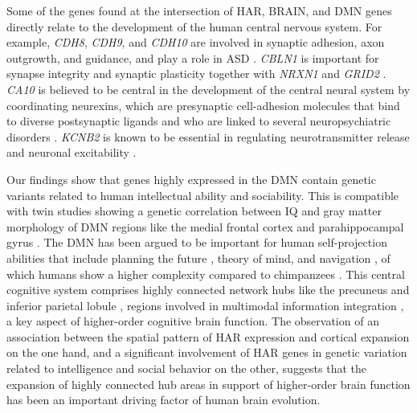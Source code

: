 \begin{refsection}
Some of the genes found at the intersection of HAR, BRAIN, and DMN genes directly relate to the development of the human central nervous system. For example, \textit{CDH8}, \textit{CDH9}, and \textit{CDH10} are involved in synaptic adhesion, axon outgrowth, and guidance, and play a role in ASD \citep{redies2012cadherins}. \textit{CBLN1} is important for synapse integrity and synaptic plasticity together with \textit{NRXN1} and \textit{GRID2} \citep{hirai2005cbln1}. \textit{CA10} is believed to be central in the development of the central neural system by coordinating neurexins, which are presynaptic cell-adhesion molecules that bind to diverse postsynaptic ligands and who are linked to several neuropsychiatric disorders \citep{sterky2017carbonic}. \textit{KCNB2} is known to be essential in regulating neurotransmitter release and neuronal excitability \citep{coetzee1999molecular}.

Our findings show that genes highly expressed in the DMN contain genetic variants related to human intellectual ability and sociability. This is compatible with twin studies showing a genetic correlation between IQ and gray matter morphology of DMN regions like the medial frontal cortex and parahippocampal gyrus \citep{hulshoff2006van}. The DMN has been argued to be important for human self-projection abilities that include planning the future \citep{suddendorf2009mental}, theory of mind, and navigation \citep{buckner2007self}, of which humans show a higher complexity compared to chimpanzees \citep{corballis2013mental}. This central cognitive system comprises highly connected network hubs like the precuneus and inferior parietal lobule \citep{van_den_heuvel_network_2013}, regions involved in multimodal information integration \citep{barbey2018network}, a key aspect of higher-order cognitive brain function. The observation of an association between the spatial pattern of HAR expression and cortical expansion on the one hand, and a significant involvement of HAR genes in genetic variation related to intelligence and social behavior on the other, suggests that the expansion of highly connected hub areas in support of higher-order brain function has been an important driving factor of human brain evolution.


\end{refsection}
